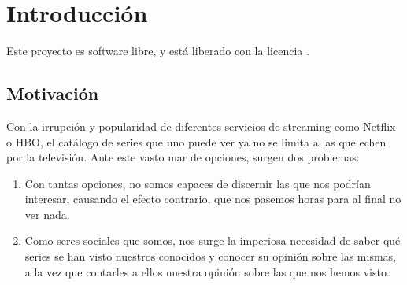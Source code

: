 \chapter{Introducción}

Este proyecto es software libre, y está liberado con la licencia \cite{gplv3}.

\section{Motivación}
Con la irrupción y popularidad de diferentes servicios de streaming como Netflix o HBO, el catálogo de series que uno puede ver ya no se limita a las que echen por la televisión. Ante este vasto mar de opciones, surgen dos problemas:
\begin{enumerate}
    \item Con tantas opciones, no somos capaces de discernir las que nos podrían interesar, causando el efecto contrario, que nos pasemos horas para al final no ver nada.
    \item Como seres sociales que somos, nos surge la imperiosa necesidad de saber qué series se han visto nuestros conocidos y conocer su opinión sobre las mismas, a la vez que contarles a ellos nuestra opinión sobre las que nos hemos visto.
\end{enumerate}

